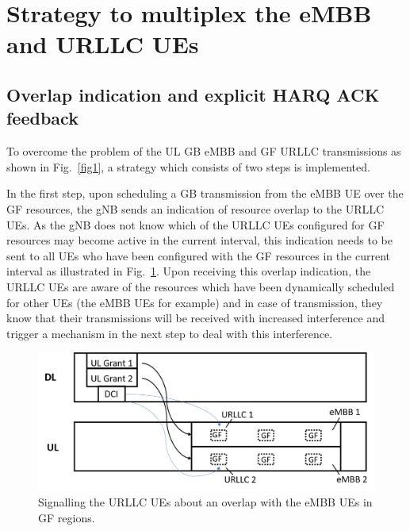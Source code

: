 \documentclass[conference]{IEEEtran}
\begin{document}

\section{Strategy to multiplex the eMBB and URLLC UEs}\label{II}

\subsection{Overlap indication and explicit HARQ ACK feedback}\label{IIAA}
To overcome the problem of the UL GB eMBB and GF URLLC transmissions as shown in Fig.~\ref{fig1}, a strategy which consists of two steps is implemented. 

In the first step, upon scheduling a GB transmission from the eMBB UE over the GF resources, the gNB sends an indication of resource overlap to the URLLC UEs. As the gNB does not know which of the URLLC UEs configured for GF resources may become active in the current interval, this indication needs to be sent to all UEs who have been configured with the GF resources in the current interval as illustrated in Fig.~\ref{fig2}. Upon receiving this overlap indication, the URLLC UEs are aware of the resources which have been dynamically scheduled for other UEs (the eMBB UEs for example) and in case of transmission, they know that their transmissions will be received with increased interference and trigger a mechanism in the next step to deal with this interference.

\begin{figure}[htbp]
\centerline{\includegraphics[scale=0.33]{fig2.png}}
\caption{Signalling the URLLC UEs about an overlap with the eMBB UEs in GF regions.}
\label{fig2}
\end{figure}
\end{document}

